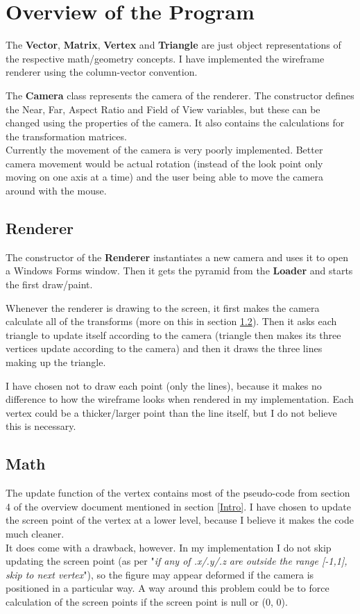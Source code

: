 \section{Overview of the Program}
The \textbf{Vector}, \textbf{Matrix}, \textbf{Vertex} and \textbf{Triangle} are just object representations of the respective math/geometry concepts. I have implemented the wireframe renderer using the column-vector convention.

The \textbf{Camera} class represents the camera of the renderer. The constructor defines the Near, Far, Aspect Ratio and Field of View variables, but these can be changed using the properties of the camera. It also contains the calculations for the transformation matrices. 
\\Currently the movement of the camera is very poorly implemented. Better camera movement would be actual rotation (instead of the look point only moving on one axis at a time) and the user being able to move the camera around with the mouse.

\subsection{Renderer}
The constructor of the \textbf{Renderer} instantiates a new camera and uses it to open a Windows Forms window. Then it gets the pyramid from the \textbf{Loader} and starts the first draw/paint.

Whenever the renderer is drawing to the screen, it first makes the camera calculate all of the transforms (more on this in section \ref{Math}). Then it asks each triangle to update itself according to the camera (triangle then makes its three vertices update according to the camera) and then it draws the three lines making up the triangle.

I have chosen not to draw each point (only the lines), because it makes no difference to how the wireframe looks when rendered in my implementation. Each vertex could be a thicker/larger point than the line itself, but I do not believe this is necessary.

\subsection{Math}
\label{Math}
The update function of the vertex contains most of the pseudo-code from section 4 of the overview document mentioned in section \ref{Intro}. I have chosen to update the screen point of the vertex at a lower level, because I believe it makes the code much cleaner. 
\\It does come with a drawback, however. In my implementation I do not skip updating the screen point (as per "\textit{if any of .x/.y/.z are outside the range [-1,1], skip to next vertex}"), so the figure may appear deformed if the camera is positioned in a particular way. A way around this problem could be to force calculation of the screen points if the screen point is null or (0, 0).

